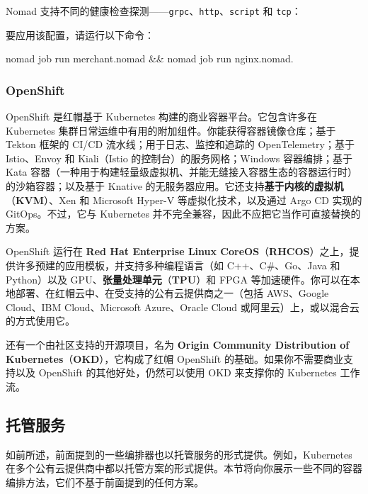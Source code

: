 \label{idx:1822}
Nomad 支持不同的健康检查探测——\texttt{grpc}、\texttt{http}、\texttt{script} 和 \texttt{tcp}：

\begin{codebox}[text]
        check {
          type = "tcp"
          interval = "10s"
          timeout = "2s"
        }
      }
    }
  }
}
\end{codebox}

要应用该配置，请运行以下命令：

\begin{codebox}[text]
nomad job run merchant.nomad && nomad job run nginx.nomad.
\end{codebox}

\subsubsection{OpenShift}

\label{idx:1823}
\label{idx:1824}
\label{idx:1825}
OpenShift 是红帽基于 Kubernetes 构建的商业容器平台。它包含许多在 Kubernetes 集群日常运维中有用的附加组件。你能获得容器镜像仓库；基于 Tekton 框架的 CI/CD 流水线；用于日志、监控和追踪的 OpenTelemetry；基于 Istio、Envoy 和 Kiali（Istio 的控制台）的服务网格；Windows 容器编排；基于 Kata 容器（一种用于构建轻量级虚拟机、并能无缝接入容器生态的容器运行时）的沙箱容器；以及基于 Knative 的无服务器应用。它还支持\textbf{基于内核的虚拟机}（\textbf{KVM}）、Xen 和 Microsoft Hyper-V 等虚拟化技术，以及通过 Argo CD 实现的 GitOps。不过，它与 Kubernetes 并不完全兼容，因此不应把它当作可直接替换的方案。

\label{idx:1826}
\label{idx:1827}
OpenShift 运行在 \textbf{Red Hat Enterprise Linux CoreOS}（\textbf{RHCOS}）之上，提供许多预建的应用模板，并支持多种编程语言（如 C++、C\#、Go、Java 和 Python）以及 GPU、\textbf{张量处理单元}（\textbf{TPU}）和 FPGA 等加速硬件。你可以在本地部署、在红帽云中、在受支持的公有云提供商之一（包括 AWS、Google Cloud、IBM Cloud、Microsoft Azure、Oracle Cloud 或阿里云）上，或以混合云的方式使用它。

\label{idx:1828}
还有一个由社区支持的开源项目，名为 \textbf{Origin Community Distribution of Kubernetes}（\textbf{OKD}），它构成了红帽 OpenShift 的基础。如果你不需要商业支持以及 OpenShift 的其他好处，仍然可以使用 OKD 来支撑你的 Kubernetes 工作流。

\subsection{托管服务}

\label{idx:1829}
\label{idx:1830}
如前所述，前面提到的一些编排器也以托管服务的形式提供。例如，Kubernetes 在多个公有云提供商中都以托管方案的形式提供。本节将向你展示一些不同的容器编排方法，它们不基于前面提到的任何方案。

